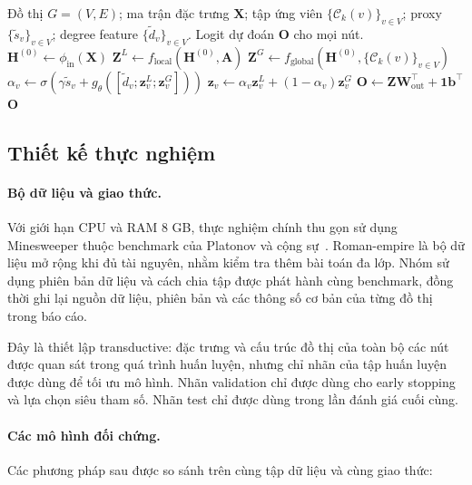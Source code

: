 \documentclass[12pt,a4paper]{article}
\numberwithin{equation}{section}
\theoremstyle{definition}
\begin{document}
\begin{algorithm}[H]
\caption{Forward pass của mô hình local–global đề xuất}
\label{alg:forward_pass}
\begin{algorithmic}[1]
\Require Đồ thị $G = (V, E)$; ma trận đặc trưng $\mathbf{X}$; tập ứng viên $\{\mathcal{C}_k(v)\}_{v \in V}$; proxy $\{\tilde{s}_v\}_{v \in V}$; degree feature $\{\tilde{d}_v\}_{v \in V}$.
\Ensure Logit dự đoán $\mathbf{O}$ cho mọi nút.
\State $\mathbf{H}^{(0)} \gets \phi_{\text{in}}(\mathbf{X})$
\State $\mathbf{Z}^L \gets f_{\text{local}}(\mathbf{H}^{(0)}, \mathbf{A})$
\State $\mathbf{Z}^G \gets f_{\text{global}}\left(\mathbf{H}^{(0)}, \{\mathcal{C}_k(v)\}_{v \in V}\right)$
    \State $\alpha_v \gets \sigma\left(\gamma \tilde{s}_v + g_\theta([\tilde{d}_v; \mathbf{z}_v^L; \mathbf{z}_v^G])\right)$
    \State $\mathbf{z}_v \gets \alpha_v \mathbf{z}_v^L + (1 - \alpha_v)\mathbf{z}_v^G$
\EndFor
\State $\mathbf{O} \gets \mathbf{Z}\mathbf{W}_{\text{out}}^\top + \mathbf{1}\mathbf{b}^\top$
\State \Return $\mathbf{O}$
\end{algorithmic}
\end{algorithm}

\subsection{Thiết kế thực nghiệm}

\paragraph{Bộ dữ liệu và giao thức.}
Với giới hạn CPU và RAM 8 GB, thực nghiệm chính thu gọn sử dụng Minesweeper thuộc benchmark của Platonov và cộng sự~\cite{platonov2023critical}. Roman-empire là bộ dữ liệu mở rộng khi đủ tài nguyên, nhằm kiểm tra thêm bài toán đa lớp. Nhóm sử dụng phiên bản dữ liệu và cách chia
tập được phát hành cùng benchmark, đồng thời ghi lại nguồn dữ liệu, phiên
bản và các thông số cơ bản của từng đồ thị trong báo cáo.

Đây là thiết lập transductive: đặc trưng và cấu trúc đồ thị của toàn bộ
các nút được quan sát trong quá trình huấn luyện, nhưng chỉ nhãn của tập
huấn luyện được dùng để tối ưu mô hình. Nhãn validation chỉ được dùng
cho early stopping và lựa chọn siêu tham số. Nhãn test chỉ được dùng
trong lần đánh giá cuối cùng.

\paragraph{Các mô hình đối chứng.}
Các phương pháp sau được so sánh trên cùng tập dữ liệu và cùng giao thức:
\end{document}
